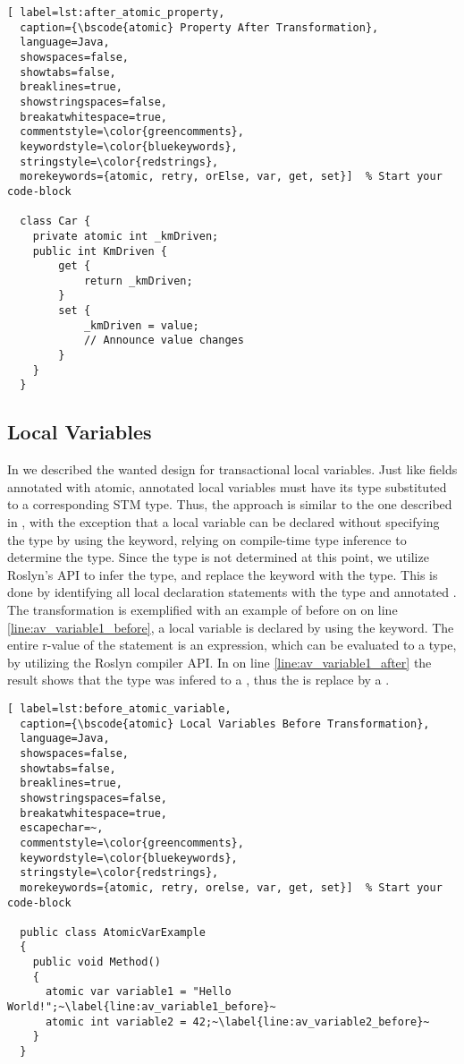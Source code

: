 \begin{lstlisting}[ label=lst:after_atomic_property,
  caption={\bscode{atomic} Property After Transformation},
  language=Java,  
  showspaces=false,
  showtabs=false,
  breaklines=true,
  showstringspaces=false,
  breakatwhitespace=true,
  commentstyle=\color{greencomments},
  keywordstyle=\color{bluekeywords},
  stringstyle=\color{redstrings},
  morekeywords={atomic, retry, orElse, var, get, set}]  % Start your code-block

  class Car {
    private atomic int _kmDriven;
    public int KmDriven {
        get {
            return _kmDriven;
        }
        set {
            _kmDriven = value;
            // Announce value changes
        }
    }
  }
\end{lstlisting}


\subsection{Local Variables}
In  we described the wanted design for transactional local variables. 
Just like fields annotated with atomic, annotated local variables must have its type substituted to a corresponding \ac{STM} type. Thus, the approach is similar to the one described in , with the exception that a local variable can be declared without specifying the type by using the  keyword, relying on compile-time type inference to determine the type. Since the type is not determined at this point, we utilize Roslyn's \ac{API} to infer the type, and replace the  keyword with the type. This is done by identifying all local declaration statements with the type  and annotated . The transformation is exemplified with an example of before on  on line \ref{line:av_variable1_before}, a local variable is declared by using the  keyword. The entire r-value of the statement is an expression, which can be evaluated to a type, by utilizing the Roslyn compiler \ac{API}. In  on line  \ref{line:av_variable1_after} the result shows that the type was infered to a , thus the  is replace by a .


\begin{lstlisting}[ label=lst:before_atomic_variable,
  caption={\bscode{atomic} Local Variables Before Transformation},
  language=Java,  
  showspaces=false,
  showtabs=false,
  breaklines=true,
  showstringspaces=false,
  breakatwhitespace=true,
  escapechar=~,
  commentstyle=\color{greencomments},
  keywordstyle=\color{bluekeywords},
  stringstyle=\color{redstrings},
  morekeywords={atomic, retry, orelse, var, get, set}]  % Start your code-block

  public class AtomicVarExample
  {
    public void Method()
    {
      atomic var variable1 = "Hello World!";~\label{line:av_variable1_before}~
      atomic int variable2 = 42;~\label{line:av_variable2_before}~
    }
  }
\end{lstlisting}

